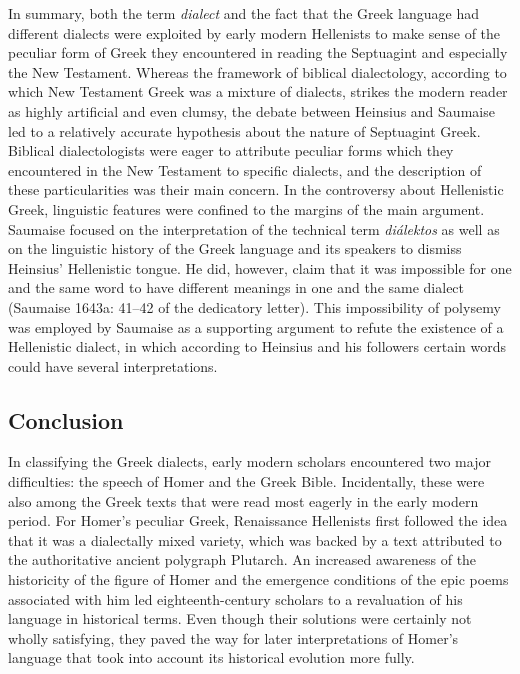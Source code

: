 \begin{styleStandard}
In summary, both the term \textit{dialect} and the fact that the Greek language had different dialects were exploited by early modern Hellenists to make sense of the peculiar form of Greek they encountered in reading the Septuagint and especially the New Testament. Whereas the framework of biblical dialectology, according to which New Testament Greek was a mixture of dialects, strikes the modern reader as highly artificial and even clumsy, the debate between Heinsius and Saumaise led to a relatively accurate hypothesis about the nature of Septuagint Greek. Biblical dialectologists were eager to attribute peculiar forms which they encountered in the New Testament to specific dialects, and the description of these particularities was their main concern. In the controversy about Hellenistic Greek, linguistic features were confined to the margins of the main argument. Saumaise focused on the interpretation of the technical term \textit{diálektos} as well as on the linguistic history of the Greek language and its speakers to dismiss Heinsius’ Hellenistic tongue. He did, however, claim that it was impossible for one and the same word to have different meanings in one and the same dialect (Saumaise 1643a: 41–42 of the dedicatory letter). This impossibility of polysemy was employed by Saumaise as a supporting argument to refute the existence of a Hellenistic dialect, in which according to Heinsius and his followers certain words could have several interpretations.
\end{styleStandard}

\subsection{Conclusion}
\hypertarget{Toc19704833}{}\begin{styleStandard}
In classifying the Greek dialects, early modern scholars encountered two major difficulties: the speech of Homer and the Greek Bible. Incidentally, these were also among the Greek texts that were read most eagerly in the early modern period. For Homer’s peculiar Greek, Renaissance Hellenists first followed the idea that it was a dialectally mixed variety, which was backed by a text attributed to the authoritative ancient polygraph Plutarch. An increased awareness of the historicity of the figure of Homer and the emergence conditions of the epic poems associated with him led eighteenth-century scholars to a revaluation of his language in historical terms. Even though their solutions were certainly not wholly satisfying, they paved the way for later interpretations of Homer’s language that took into account its historical evolution more fully.
\end{styleStandard}

